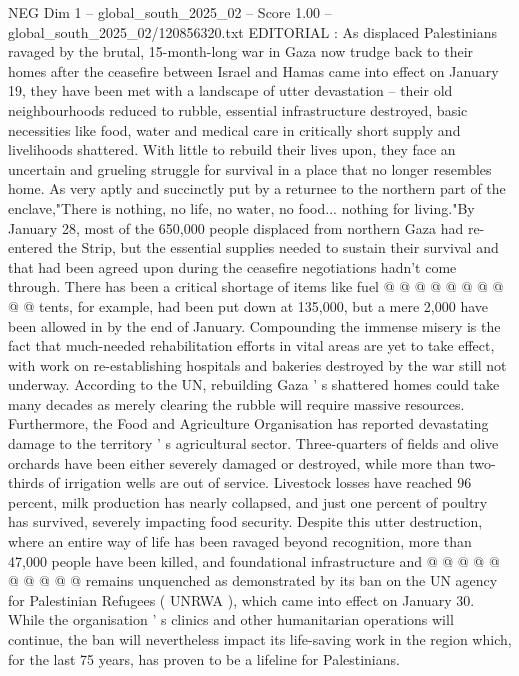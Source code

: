 \begin{textsample}{NEG Dim 1 – global\_south\_2025\_02 – Score 1.00 – global\_south\_2025\_02/120856320.txt}  \label{ex:f1_neg_093}
EDITORIAL : As displaced Palestinians ravaged by the brutal, 15-month-long war in Gaza now trudge back to their homes after the ceasefire between Israel and Hamas came into effect on January 19, they have been met with a landscape of utter devastation -- their old neighbourhoods reduced to rubble, essential infrastructure destroyed, basic necessities like food, water and medical care in critically short supply and livelihoods shattered.
With little to rebuild their lives upon, they face an uncertain and grueling struggle for survival in a place that no longer resembles home.
As very aptly and succinctly put by a returnee to the northern part of the enclave,"There is nothing, no life, no water, no food... nothing for living."By January 28, most of the 650,000 people displaced from northern Gaza had re-entered the Strip, but the essential supplies needed to sustain their survival and that had been agreed upon during the ceasefire negotiations hadn't come through.
There has been a critical shortage of items like fuel @ @ @ @ @ @ @ @ @ @ tents, for example, had been put down at 135,000, but a mere 2,000 have been allowed in by the end of January.
Compounding the immense misery is the fact that much-needed rehabilitation efforts in vital areas are yet to take effect, with work on re-establishing hospitals and bakeries destroyed by the war still not underway.
According to the UN, rebuilding Gaza ' s shattered homes could take many decades as merely clearing the rubble will require massive resources.
Furthermore, the Food and Agriculture Organisation has reported devastating damage to the territory ' s agricultural sector.
Three-quarters of fields and olive orchards have been either severely damaged or destroyed, while more than two-thirds of irrigation wells are out of service.
Livestock losses have reached 96 percent, milk production has nearly collapsed, and just one percent of poultry has survived, severely impacting food security.
Despite this utter destruction, where an entire way of life has been ravaged beyond recognition, more than 47,000 people have been killed, and foundational infrastructure and @ @ @ @ @ @ @ @ @ @ remains unquenched as demonstrated by its ban on the UN agency for Palestinian Refugees ( UNRWA ), which came into effect on January 30.
While the organisation ' s clinics and other humanitarian operations will continue, the ban will nevertheless impact its life-saving work in the region which, for the last 75 years, has proven to be a lifeline for Palestinians.

\end{textsample}
